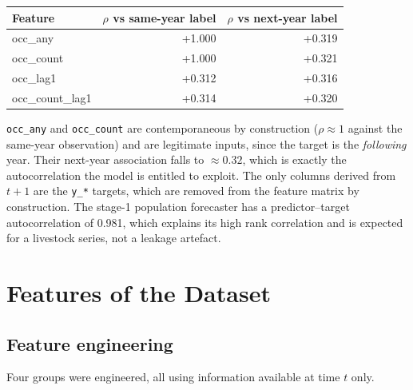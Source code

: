 \documentclass[11pt]{article}
\begin{document}
\begin{center}
\small
\begin{tabular}{@{}lrr@{}}
\toprule
\textbf{Feature} & \textbf{$\rho$ vs same-year label} & \textbf{$\rho$ vs next-year label} \\
\midrule
occ\_any & +1.000 & +0.319 \\
occ\_count & +1.000 & +0.321 \\
occ\_lag1 & +0.312 & +0.316 \\
occ\_count\_lag1 & +0.314 & +0.320 \\

\bottomrule
\end{tabular}
\end{center}

\noindent
\texttt{occ\_any} and \texttt{occ\_count} are contemporaneous by construction
($\rho \approx 1$ against the same-year observation) and are legitimate inputs, since the target is
the \emph{following} year. Their next-year association falls to $\approx 0.32$, which is exactly
the autocorrelation the model is entitled to exploit. The only columns derived from $t+1$ are the
\texttt{y\_*} targets, which are removed from the feature matrix by construction. The stage-1
population forecaster has a predictor--target autocorrelation of
0.981, which explains its high rank correlation and is
expected for a livestock series, not a leakage artefact.

\section{Features of the Dataset}

\subsection{Feature engineering}

Four groups were engineered, all using information available at time $t$ only.
\end{document}
